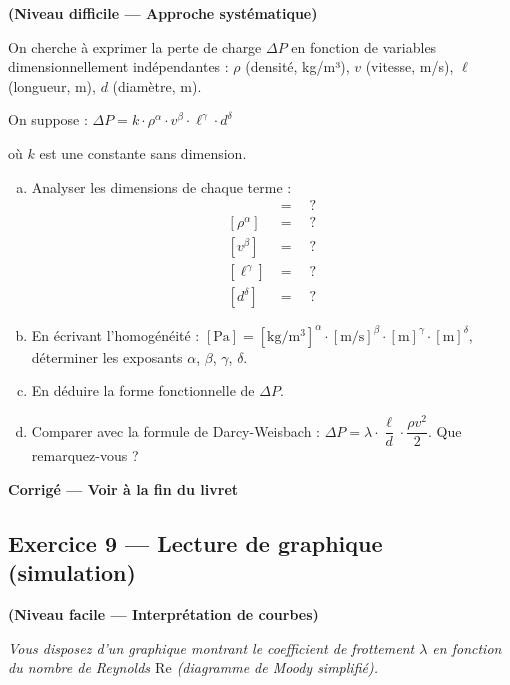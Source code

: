 \textbf{(Niveau difficile — Approche systématique)}

On cherche à exprimer la perte de charge $\Delta P$ en fonction de variables dimensionnellement indépendantes :
$\rho$ (densité, kg/m³), $v$ (vitesse, m/s), $\ell$ (longueur, m), $d$ (diamètre, m).

On suppose : $\Delta P = k \cdot \rho^\alpha \cdot v^\beta \cdot \ell^\gamma \cdot d^\delta$

où $k$ est une constante sans dimension.

\begin{enumerate}[a)]
  \item Analyser les dimensions de chaque terme :
        \begin{align*}
          [\Delta P] &= \quad ? \\
          [\rho^\alpha] &= \quad ? \\
          [v^\beta] &= \quad ? \\
          [\ell^\gamma] &= \quad ? \\
          [d^\delta] &= \quad ?
        \end{align*}

  \item En écrivant l'homogénéité : $[\mathrm{Pa}] = [\mathrm{kg/m^3}]^\alpha \cdot [\mathrm{m/s}]^\beta \cdot
        [\mathrm{m}]^\gamma \cdot [\mathrm{m}]^\delta$, déterminer les exposants $\alpha$, $\beta$, $\gamma$,
        $\delta$.

  \item En déduire la forme fonctionnelle de $\Delta P$.

  \item Comparer avec la formule de Darcy-Weisbach : $\Delta P = \lambda \cdot \dfrac{\ell}{d} \cdot \dfrac{\rho v^2}{2}$. 
        Que remarquez-vous ?
\end{enumerate}

\textbf{Corrigé — Voir à la fin du livret}

\subsection*{Exercice 9 — Lecture de graphique (simulation)}

\textbf{(Niveau facile — Interprétation de courbes)}

\textit{Vous disposez d'un graphique montrant le coefficient de frottement $\lambda$ en fonction du nombre de Reynolds
$\mathrm{Re}$ (diagramme de Moody simplifié).}

